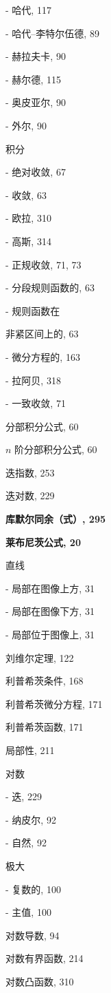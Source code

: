- 哈代, 117

- 哈代–李特尔伍德, 89

- 赫拉夫卡, 90

- 赫尔德, 115

- 奥皮亚尔, 90

- 外尔, 90

积分

- 绝对收敛, 67

- 收敛, 63

- 欧拉, 310

- 高斯, 314

- 正规收敛, 71, 73

- 分段规则函数的, 63

- 规则函数在

非紧区间上的, 63

- 微分方程的, 163

- 拉阿贝, 318

- 一致收敛, 71

分部积分公式, 60

\(n\) 阶分部积分公式, 60

迭指数, 253

迭对数, 229

\par\noindent\textbf{库默尔同余（式）, 295}\par

\par\noindent\textbf{莱布尼茨公式, 20}\par

直线

- 局部在图像上方, 31

- 局部在图像下方, 31

- 局部位于图像上, 31

刘维尔定理, 122

利普希茨条件, 168

利普希茨微分方程, 171

利普希茨函数, 171

局部性, 211

对数

- 迭, 229

- 纳皮尔, 92

- 自然, 92

极大

- 复数的, 100

- 主值, 100

对数导数, 94

对数有界函数, 214

对数凸函数, 310

